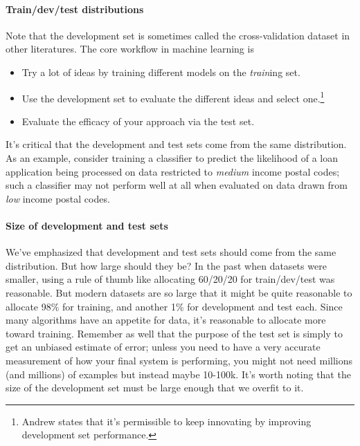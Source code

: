\documentclass[12pt]{article}
\begin{document}
\paragraph{Train/dev/test distributions} Note that the development set is 
sometimes called the cross-validation dataset in other literatures. The core workflow in machine learning is
\begin{itemize} \item Try a lot of ideas by training different models on the \emph{train}ing set.
\item Use the development set to evaluate the different ideas and select one.\footnote{Andrew states that it's permissible to keep innovating by improving development set performance.}
\item Evaluate the efficacy of your approach via the test set. \end{itemize}

It's critical that the development and test sets come from the same distribution. As an example, consider training a classifier to predict the likelihood of a loan application being processed on data restricted to \emph{medium} income
postal codes; such a classifier may not perform well at all when evaluated on data drawn from \emph{low} income
postal codes.

\paragraph{Size of development and test sets} We've emphasized that development and test sets should come from the same distribution. But how large should they be? In the past when datasets were smaller, using a rule of thumb like
allocating 60/20/20 for train/dev/test was reasonable. But modern datasets are so large that it might be quite reasonable to allocate 98\% for training, and another 1\% for development and test each. Since many algorithms have an appetite for data, it's reasonable to allocate more toward training. Remember as well that the purpose of the test set is simply to get an unbiased estimate of error; unless you need to have a very accurate measurement of how your final system is performing, you might not need millions (and millions) of examples but instead maybe 10-100k. It's worth noting that the size of the development set must be large enough that we overfit to it.
\end{document}
